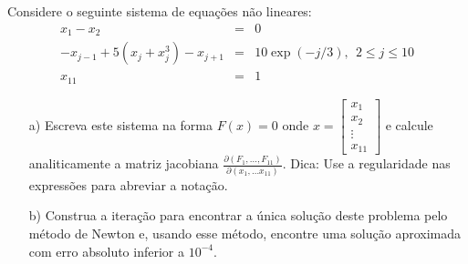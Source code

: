 \begin{exer}  Considere o seguinte sistema de equações não lineares:
\begin{eqnarray}
x_1-x_2&=&0\nonumber\\
-x_{j-1}+5(x_j+x_j^3)-x_{j+1}&=&10\exp(-j/3),~~ 2\leq j \leq 10\nonumber\\
x_{11}&=&1
\end{eqnarray}
\begin{itemize}
\item [a)] Escreva este sistema na forma $F(x)=0$ onde $x=\left[\begin{array}{c} x_1\\ x_2\\ \vdots \\ x_{11}\end{array}\right]$ e calcule analiticamente a matriz jacobiana $\frac{\partial (F_1,\ldots, F_{11})}{\partial (x_1,\ldots x_{11})}$. Dica: Use a regularidade nas expressões para abreviar a notação.
\item [b)] Construa a iteração para encontrar a única solução deste problema pelo método de Newton e, usando esse método, encontre uma solução aproximada com erro absoluto inferior a $10^{-4}$.
\end{itemize}
\end{exer}
